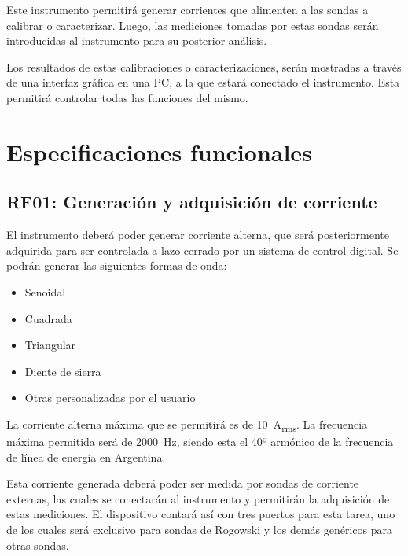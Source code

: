 \documentclass[titlepage, 12pt]{article}
\begin{document}
  Este instrumento permitirá generar corrientes que alimenten a las sondas a calibrar o caracterizar. Luego, las mediciones tomadas por estas sondas serán introducidas al instrumento para su posterior análisis.

  Los resultados de estas calibraciones o caracterizaciones, serán mostradas a través de una interfaz gráfica en una PC, a la que estará conectado el instrumento. Esta permitirá controlar todas las funciones del mismo.


  \section{Especificaciones funcionales}

  \subsection{RF01: Generación y adquisición de corriente}
  El instrumento deberá poder generar corriente alterna, que será posteriormente adquirida para ser controlada a lazo cerrado por un sistema de control digital. Se podrán generar las siguientes formas de onda:

  \begin{itemize}
    \item Senoidal
    \item Cuadrada
    \item Triangular
    \item Diente de sierra
    \item Otras personalizadas por el usuario
  \end{itemize}

  La corriente alterna máxima que se permitirá es de \SI{10}{A_{rms}}. La frecuencia máxima permitida será de \SI{2000}{Hz}, siendo esta el 40º armónico de la frecuencia de línea de energía en Argentina.

  Esta corriente generada deberá poder ser medida por sondas de corriente externas, las cuales se conectarán al instrumento y permitirán la adquisición de estas mediciones. El dispositivo contará así con tres puertos para esta tarea, uno de los cuales será exclusivo para sondas de Rogowski y los demás genéricos para otras sondas.
\end{document}
